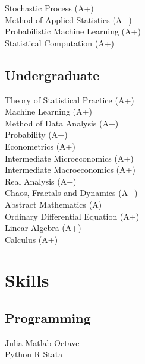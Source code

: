 \documentclass[letterpaper]{deedy-resume} %
\begin{document}
\begin{minipage}[t]{0.33\textwidth}
\sectionspace

Stochastic Process (A+)\\%
Method of Applied Statistics (A+) \\
Probabilistic Machine Learning (A+)\\%
Statistical Computation (A+) \\

\sectionspace %


\subsection{Undergraduate}
Theory of Statistical Practice (A+)\\%
Machine Learning (A+) \\
Method of Data Analysis (A+) \\
Probability (A+) \\
Econometrics (A+) \\
Intermediate Microeconomics (A+) \\
Intermediate Macroeconomics (A+) \\
Real Analysis (A+)\\%
Chaos, Fractals and Dynamics (A+) \\
Abstract Mathematics (A) \\
Ordinary Differential Equation (A+) \\
Linear Algebra (A+)\\
Calculus (A+)\\

\sectionspace %


\section{Skills}
\subsection{Programming}
Julia \textbullet{} Matlab \textbullet{} Octave \\
Python \textbullet{} R \textbullet{} Stata \\


\end{minipage}
\end{document}
